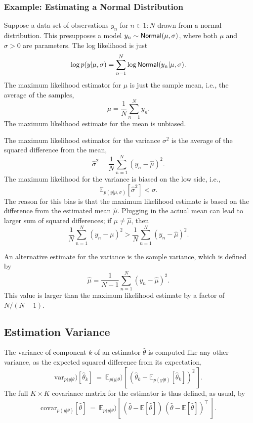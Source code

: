 \subsubsection{Example: Estimating a Normal Distribution}

Suppose a data set of observations $y_n$ for $n \in 1{:}N$ drawn from
a normal distribution.  This presupposes a model $y_n \sim
\distro{Normal}(\mu,\sigma)$, where both $\mu$ and $\sigma > 0$ are
parameters.  The log likelihood is just
\[
\log p(y|\mu,\sigma) = \sum_{n=1}^N \log
\distro{Normal}(y_n|\mu,\sigma).
\]
The maximum likelihood estimator for $\mu$ is just the sample mean,
i.e., the average of the samples,
\[
\hat{\mu} = \frac{1}{N} \sum_{n=1}^N y_n.
\]
The maximum likelihood estimate for the mean is unbiased.

The maximum likelihood estimator for the variance $\sigma^2$ is the
average of the squared difference from the mean,
\[
\hat{\sigma}^2 = \frac{1}{N} \sum_{n=1}^N (y_n - \hat{\mu})^2.
\]
The maximum likelihood for the variance is biased on the low side,
i.e., 
%
\[
\mathbb{E}_{p(y|\mu,\sigma)}[\hat{\sigma}^2] < \sigma.
\]
%
The reason for this bias is that the maximum likelihood estimate is
based on the difference from the estimated mean $\hat{\mu}$.  Plugging
in the actual mean can lead to larger sum of squared differences;  if
$\mu \neq \hat{\mu}$, then
\[
\frac{1}{N} \sum_{n=1}^N (y_n - \mu)^2
> 
\frac{1}{N} \sum_{n=1}^N (y_n - \hat{\mu})^2.
\]

An alternative estimate for the variance is the sample variance, which
is defined by
\[
\hat{\mu} = \frac{1}{N-1} \sum_{n=1}^N (y_n - \hat{\mu})^2.
\]
This value is larger than the maximum likelihood estimate by a factor
of $N/(N-1)$.


\subsection{Estimation Variance}

The variance of component $k$ of an estimator $\hat{\theta}$ is
computed like any other variance, as the expected squared difference
from its expectation, 
%
\[
\mbox{var}_{p(y|\theta})[\hat{\theta}_k]
\ = \
\mathbb{E}_{p(y|\theta})[\, (\hat{\theta}_k -
\mathbb{E}_{p(y|\theta)}[\hat{\theta}_k])^2 \,].
\]
%
The full $K \times K$ covariance matrix for the estimator is thus
defined, as usual, by
%
\[
\mbox{covar}_{p(y|\theta)}[\hat{\theta}]
\ = \
\mathbb{E}_{p(y|\theta})[\, (\hat{\theta} - \mathbb{E}[\hat{\theta}]) \,
                         (\hat{\theta} -
                         \mathbb{E}[\hat{\theta}])^{\top} \, ].
\]

